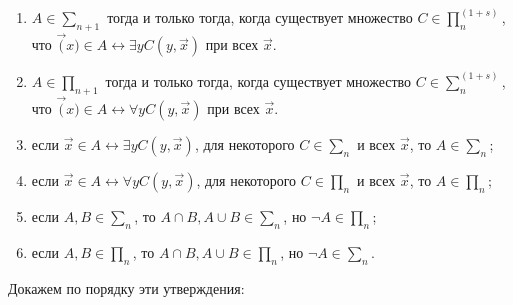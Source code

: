 \documentclass[a4paper, 10pt]{article}
\begin{document}
\begin{enumerate}
	\item{$A \in \sum_{n+1}$ тогда и только тогда, когда существует множество $C \in \prod_n^{(1 + s)}$, что $\vec(x) \in A \leftrightarrow \exists y C(y, \vec{x})$ при всех $\vec{x}$.}
	\item{$A \in \prod_{n+1}$ тогда и только тогда, когда существует множество $C \in \sum_n^{(1 + s)}$, что $\vec(x) \in A \leftrightarrow \forall y C(y, \vec{x})$ при всех $\vec{x}$.}
	\item{если $\vec{x} \in A \leftrightarrow \exists y C(y, \vec{x})$, для некоторого $C \in \sum_n$} и всех $\vec{x}$, то $A \in \sum_n$;
	\item{если $\vec{x} \in A \leftrightarrow \forall y C(y, \vec{x})$, для некоторого $C \in \prod_n$} и всех $\vec{x}$, то $A \in \prod_n$;
	\item{если $A, B \in \sum_n$, то $A \cap B, A \cup B \in \sum_n$, но $\lnot A \in \prod_n$};
	\item{если $A, B \in \prod_n$, то $A \cap B, A \cup B \in \prod_n$, но $\lnot A \in \sum_n$}.
\end{enumerate}
Докажем по порядку эти утверждения:
\end{document}
